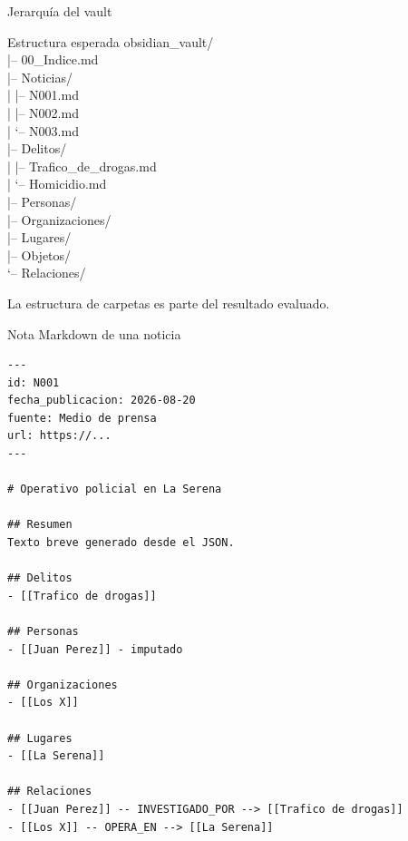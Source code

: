 \documentclass[11pt,aspectratio=169]{beamer}
\begin{document}
\begin{frame}[fragile]{Jerarquía del vault}
\footnotesize
\begin{block}{Estructura esperada}
\ttfamily\tiny
obsidian\_vault/\\
|-- 00\_Indice.md\\
|-- Noticias/\\
|   |-- N001.md\\
|   |-- N002.md\\
|   `-- N003.md\\
|-- Delitos/\\
|   |-- Trafico\_de\_drogas.md\\
|   `-- Homicidio.md\\
|-- Personas/\\
|-- Organizaciones/\\
|-- Lugares/\\
|-- Objetos/\\
`-- Relaciones/\\
\end{block}

\scriptsize
La estructura de carpetas es parte del resultado evaluado.
\end{frame}

\begin{frame}[fragile]{Nota Markdown de una noticia}
\tiny
\begin{lstlisting}
---
id: N001
fecha_publicacion: 2026-08-20
fuente: Medio de prensa
url: https://...
---

# Operativo policial en La Serena

## Resumen
Texto breve generado desde el JSON.

## Delitos
- [[Trafico de drogas]]

## Personas
- [[Juan Perez]] - imputado

## Organizaciones
- [[Los X]]

## Lugares
- [[La Serena]]

## Relaciones
- [[Juan Perez]] -- INVESTIGADO_POR --> [[Trafico de drogas]]
- [[Los X]] -- OPERA_EN --> [[La Serena]]
\end{lstlisting}
\end{frame}
\end{document}
